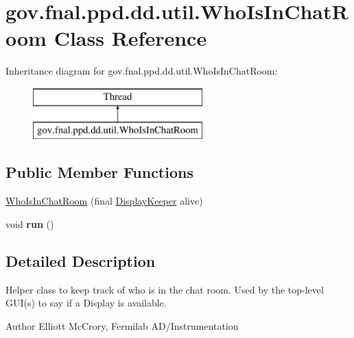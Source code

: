 \hypertarget{classgov_1_1fnal_1_1ppd_1_1dd_1_1util_1_1WhoIsInChatRoom}{\section{gov.\-fnal.\-ppd.\-dd.\-util.\-Who\-Is\-In\-Chat\-Room Class Reference}
\label{classgov_1_1fnal_1_1ppd_1_1dd_1_1util_1_1WhoIsInChatRoom}
}
Inheritance diagram for gov.\-fnal.\-ppd.\-dd.\-util.\-Who\-Is\-In\-Chat\-Room\-:\begin{figure}[H]
\begin{center}
\leavevmode
\includegraphics[height=2.000000cm]{classgov_1_1fnal_1_1ppd_1_1dd_1_1util_1_1WhoIsInChatRoom}
\end{center}
\end{figure}
\subsection*{Public Member Functions}
\begin{DoxyCompactItemize}
\item 
\hyperlink{classgov_1_1fnal_1_1ppd_1_1dd_1_1util_1_1WhoIsInChatRoom_aa1f28f08a939bd49a1fc52d048aa1ea3}{Who\-Is\-In\-Chat\-Room} (final \hyperlink{interfacegov_1_1fnal_1_1ppd_1_1dd_1_1util_1_1DisplayKeeper}{Display\-Keeper} alive)
\item 
\hypertarget{classgov_1_1fnal_1_1ppd_1_1dd_1_1util_1_1WhoIsInChatRoom_a90ed5ae5ed8c32c729d0162964b9a668}{void {\bfseries run} ()}\label{classgov_1_1fnal_1_1ppd_1_1dd_1_1util_1_1WhoIsInChatRoom_a90ed5ae5ed8c32c729d0162964b9a668}

\end{DoxyCompactItemize}


\subsection{Detailed Description}
Helper class to keep track of who is in the chat room. Used by the top-\/level G\-U\-I(s) to say if a Display is available.

\begin{DoxyAuthor}{Author}
Elliott Mc\-Crory, Fermilab A\-D/\-Instrumentation 
\end{DoxyAuthor}


